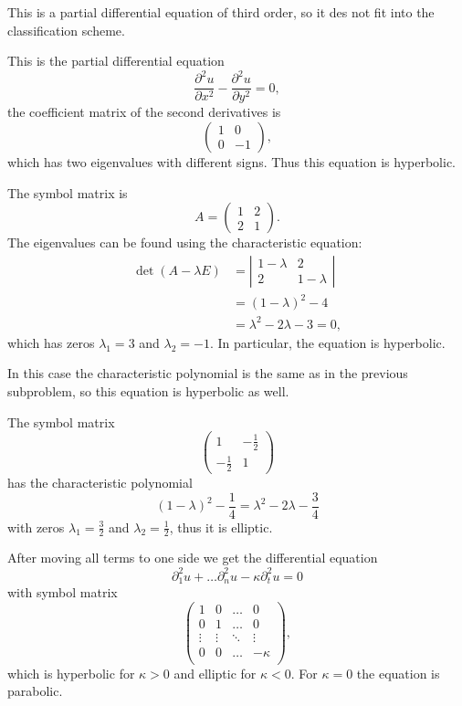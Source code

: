 \begin{loesung}
\begin{teilaufgaben}
\item
This is a partial differential equation of third order, so it des
not fit into the classification scheme.
\item
This is the partial differential equation
\[
\frac{\partial^2u}{\partial x^2}-\frac{\partial^2 u}{\partial y^2}=0,
\]
the coefficient matrix of the second derivatives is
\[
\begin{pmatrix}
1&0\\0&-1
\end{pmatrix},
\]
which has two eigenvalues with different signs.
Thus this equation is hyperbolic.
\item
The symbol matrix is
\[
A=\begin{pmatrix}
1&2\\2&1
\end{pmatrix}.
\]
The eigenvalues can be found using the characteristic equation:
\begin{align*}
\det(A-\lambda E)
&=
\left|\begin{matrix} 1-\lambda&2\\2&1-\lambda\end{matrix}\right|
\\
&=(1-\lambda)^2-4\\
&=\lambda^2-2\lambda-3=0,
\end{align*}
which has zeros
$\lambda_1=3$ and $\lambda_2=-1$.
In particular, the equation is hyperbolic.
\item
In this case the characteristic polynomial is the same as in the
previous subproblem, so this equation is hyperbolic as well.
\item
The symbol matrix
\[
\begin{pmatrix}
1&-\frac12\\
-\frac12&1
\end{pmatrix}
\]
has the characteristic polynomial
\[
(1-\lambda)^2-\frac14=\lambda^2-2\lambda-\frac34
\]
with zeros
$\lambda_1=\frac32$ and $\lambda_2=\frac12$,
thus it is elliptic.
\item
After moving all terms to one side we get the differential equation
\[
\partial_1^2u+\dots\partial_n^2u-\kappa\partial_t^2u=0
\]
with symbol matrix
\[
\begin{pmatrix}
1&0&\dots&0\\
0&1&\dots&0\\
\vdots&\vdots&\ddots&\vdots\\
0&0&\dots&-\kappa\\
\end{pmatrix},
\]
which is hyperbolic for
$\kappa > 0$ and elliptic for $\kappa < 0$.
For $\kappa=0$ the equation is parabolic.
\end{teilaufgaben}
\end{loesung}
